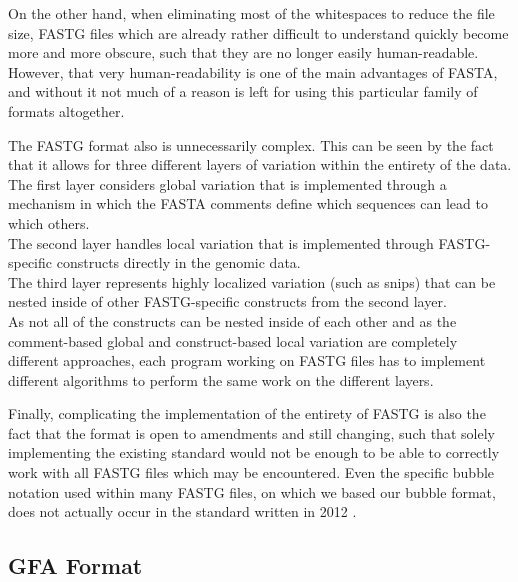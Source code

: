 \documentclass[a4paper,12pt,twoside,BCOR=10mm]{scrbook}
\begin{document}
On the other hand, when eliminating most of the whitespaces to reduce the file size,
FASTG files which are already rather difficult to understand quickly
become more and more obscure, such that they are no longer easily human-readable.
However, that very human-readability is one of the main advantages of FASTA,
and without it not much of a reason is left for using this particular family
of formats altogether.

The FASTG format also is unnecessarily complex. This can be seen by the fact that
it allows for three different layers of variation within the entirety of the data. \\
The first layer considers global variation that is implemented through a mechanism in which the
FASTA comments define which sequences can lead to which others. \\
The second layer handles local variation that is implemented through FASTG-specific constructs
directly in the genomic data. \\
The third layer represents highly localized variation (such as snips) that can be nested
inside of other FASTG-specific constructs from the second layer. \\
As not all of the constructs can be nested inside of each other
and as the comment-based global and construct-based local
variation are completely different approaches, each program working on FASTG files
has to implement different algorithms to perform the same work on the different layers.

Finally, complicating the implementation of the entirety of FASTG
is also the fact that the format is open to amendments and still changing,
such that solely implementing the existing standard would not be enough
to be able to correctly work with all FASTG files which may be encountered.
Even the specific bubble notation used within many FASTG files,
on which we based our bubble format,
does not actually occur in the standard written in 2012 \citep{specGFA1,specFASTG}.

\subsection{GFA Format}
\end{document}
